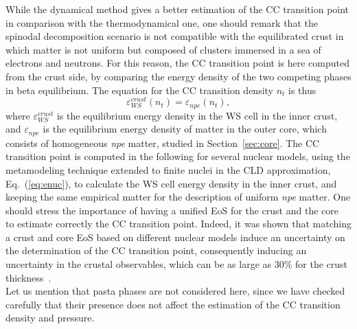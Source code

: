 While the dynamical method gives a better estimation of the CC transition point
in comparison with the thermodynamical one, one should remark that the spinodal
decomposition scenario is not compatible with the equilibrated crust in which
matter is not uniform but composed of clusters immersed in a sea of electrons
and neutrons. For this reason, the CC transition point is here computed from 
the crust side, by comparing the energy density of the two competing phases in 
beta equilibrium. The equation for the CC transition density $n_t$ is thus
%
\begin{equation}
\varepsilon_{WS}^{crust}(n_t) = \varepsilon_{npe}(n_t),
\end{equation}
%
where $\varepsilon_{WS}^{crust}$ is the equilibrium energy density in the WS
cell in the inner crust, and $\varepsilon_{npe}$ is the equilibrium energy
density of matter in the outer core, which consists of homogeneous \textit{npe} 
matter, studied in Section~\ref{sec:core}.
The CC transition point is computed in the following for several nuclear 
models, using the metamodeling technique extended to finite nuclei in the 
CLD approximation, Eq.~(\ref{eq:enuc}), to calculate the WS cell energy density in 
the inner crust, and keeping the same empirical matter for the description of 
uniform \textit{npe} matter. One should stress the importance of having a 
unified EoS for the crust and the core~\cite{Douchin2001} to estimate correctly 
the CC transition point. Indeed, it was shown that matching a crust and core
EoS based on different nuclear models induce an uncertainty on the determination 
of the CC transition point, consequently inducing an uncertainty in the crustal 
observables, which can be as large as $30\%$ for the crust
thickness~\cite{Fortin2016}.\\
Let us mention that pasta phases are not 
considered here, since we have checked carefully that their presence does not 
affect the estimation of the CC transition density and pressure.


